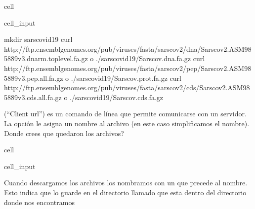 \documentclass[letterpaper,10pt,english]{jupyterBook}
\begin{document}
\begin{sphinxuseclass}{cell}\begin{sphinxVerbatimInput}

\begin{sphinxuseclass}{cell_input}
\begin{sphinxVerbatim}[commandchars=\\\{\}]
\PYGZdl{} mkdir sars\PYGZus{}covid19
\PYGZdl{} curl http://ftp.ensemblgenomes.org/pub/viruses/fasta/sars\PYGZus{}cov\PYGZus{}2/dna/Sars\PYGZus{}cov\PYGZus{}2.ASM985889v3.dna\PYGZus{}rm.toplevel.fa.gz \PYGZhy{}o ./sars\PYGZus{}covid19/Sars\PYGZus{}cov.dna.fa.gz
\PYGZdl{} curl http://ftp.ensemblgenomes.org/pub/viruses/fasta/sars\PYGZus{}cov\PYGZus{}2/pep/Sars\PYGZus{}cov\PYGZus{}2.ASM985889v3.pep.all.fa.gz \PYGZhy{}o ./sars\PYGZus{}covid19/Sars\PYGZus{}cov.prot.fa.gz
\PYGZdl{} curl http://ftp.ensemblgenomes.org/pub/viruses/fasta/sars\PYGZus{}cov\PYGZus{}2/cds/Sars\PYGZus{}cov\PYGZus{}2.ASM985889v3.cds.all.fa.gz \PYGZhy{}o ./sars\PYGZus{}covid19/Sars\PYGZus{}cov.cds.fa.gz
 
\end{sphinxVerbatim}

\end{sphinxuseclass}\end{sphinxVerbatimInput}

\end{sphinxuseclass}
\sphinxAtStartPar
{} (“Client url”) es un comando de línea que permite comunicarse con un servidor. La opción  le asigna un nombre al archivo (en este caso simplificamos el nombre). Donde crees que quedaron los archivos?

\begin{sphinxuseclass}{cell}\begin{sphinxVerbatimInput}

\begin{sphinxuseclass}{cell_input}
\begin{sphinxVerbatim}[commandchars=\\\{\}]
 
 
\end{sphinxVerbatim}

\end{sphinxuseclass}\end{sphinxVerbatimInput}

\end{sphinxuseclass}
\sphinxAtStartPar
Cuando descargamos los archivos los nombramos con un  que precede al nombre. Esto indica que lo guarde en el directorio llamado  que esta dentro del directorio donde nos encontramos 
\end{document}
